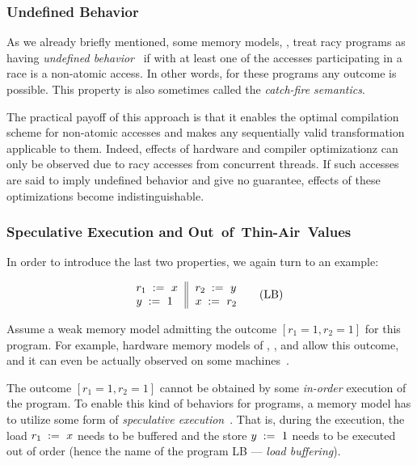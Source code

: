 \subsubsection{Undefined Behavior}
\label{sec:background:ub}

As we already briefly mentioned, some memory models, 
\eg \CPP, treat racy programs as having 
\emph{undefined behavior}~\cite{Boehm-Adve:PLDI08}
if with at least one of the accesses participating 
in a race is a non-atomic access. 
In other words, for these programs any outcome is possible. 
This property is also sometimes called the \emph{catch-fire semantics}.
  
The practical payoff of this approach  
is that it enables the optimal compilation scheme 
for non-atomic accesses and makes any sequentially valid 
transformation applicable to them.  
Indeed, effects of hardware and compiler 
optimizationz can only be observed due to racy accesses
from concurrent threads. If such accesses are said 
to imply undefined behavior and give no guarantee, 
effects of these optimizations become indistinguishable.

\subsubsection{Speculative Execution and Out~of~Thin-Air~Values}
\label{sec:background:oota}

In order to introduce the last two properties, 
we again turn to an example: 

\begin{equation*}
\inarrII{
  \readInst{}{r_1}{x}     \\
  \writeInst{}{y}{1}      \\
}{
  \readInst{}{r_2}{y}     \\
  \writeInst{}{x}{r_2}    \\
}
\tag{LB}\label{ex:lb}
\end{equation*}

Assume a weak memory model admitting 
the outcome ${[r_1=1, r_2=1]}$ for this program.
For example, hardware memory models of 
, , and \POWER
allow this outcome, and it can even be 
actually observed on some  
machines~\cite{Maranget-al:Tutorial2012}.

The outcome ${[r_1=1, r_2=1]}$ cannot be obtained by some 
\emph{in-order} execution of the program. 
To enable this kind of behaviors for programs, 
a memory model has to utilize some form of 
\emph{speculative execution}~\cite{Boudol-Petri:ESOP10, Boehm-Demsky:MSPC14}.
That is, during the execution, the load $r_1\;:=_{}\;x$
needs to be buffered and the store $y\;:=_{}\;1$ 
needs to be executed out of order
(hence the name of the program LB --- \emph{load buffering}).


